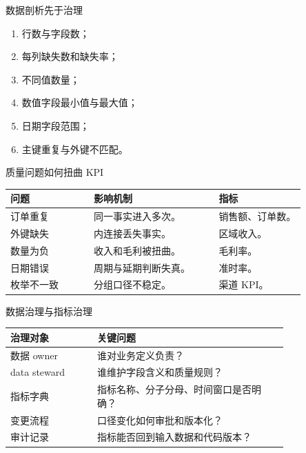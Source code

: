 \documentclass[UTF8,fontset=fandol,aspectratio=169,11pt]{ctexbeamer}
\begin{document}
\begin{frame}{数据剖析先于治理}
\begin{enumerate}
  \item 行数与字段数；
  \item 每列缺失数和缺失率；
  \item 不同值数量；
  \item 数值字段最小值与最大值；
  \item 日期字段范围；
  \item 主键重复与外键不匹配。
\end{enumerate}
\end{frame}

\begin{frame}{质量问题如何扭曲 KPI}
\begin{table}
\small
\centering
\begin{tabular}{p{0.24\linewidth}p{0.36\linewidth}p{0.25\linewidth}}
\toprule
问题 & 影响机制 & 指标\\
\midrule
订单重复 & 同一事实进入多次。 & 销售额、订单数。\\
外键缺失 & 内连接丢失事实。 & 区域收入。\\
数量为负 & 收入和毛利被扭曲。 & 毛利率。\\
日期错误 & 周期与延期判断失真。 & 准时率。\\
枚举不一致 & 分组口径不稳定。 & 渠道 KPI。\\
\bottomrule
\end{tabular}
\end{table}
\end{frame}

\begin{frame}{数据治理与指标治理}
\begin{table}
\small
\centering
\begin{tabular}{p{0.25\linewidth}p{0.55\linewidth}}
\toprule
治理对象 & 关键问题\\
\midrule
数据 owner & 谁对业务定义负责？\\
data steward & 谁维护字段含义和质量规则？\\
指标字典 & 指标名称、分子分母、时间窗口是否明确？\\
变更流程 & 口径变化如何审批和版本化？\\
审计记录 & 指标能否回到输入数据和代码版本？\\
\bottomrule
\end{tabular}
\end{table}
\end{frame}
\end{document}
